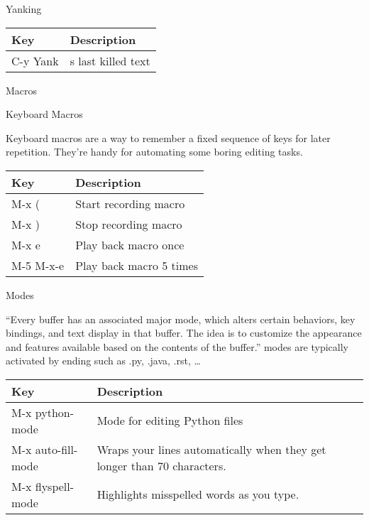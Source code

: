 Yanking

\begin{longtable}[]{@{}ll@{}}
\toprule
Key & Description\tabularnewline
\midrule
\endhead
C-y Yank & s last killed text\tabularnewline
\bottomrule
\end{longtable}

Macros

Keyboard Macros

Keyboard macros are a way to remember a fixed sequence of keys for later
repetition. They're handy for automating some boring editing tasks.

\begin{longtable}[]{@{}ll@{}}
\toprule
Key & Description\tabularnewline
\midrule
\endhead
M-x ( & Start recording macro\tabularnewline
M-x ) & Stop recording macro\tabularnewline
M-x e & Play back macro once\tabularnewline
M-5 M-x-e & Play back macro 5 times\tabularnewline
\bottomrule
\end{longtable}

Modes

``Every buffer has an associated major mode, which alters certain
behaviors, key bindings, and text display in that buffer. The idea is to
customize the appearance and features available based on the contents of
the buffer.'' modes are typically activated by ending such as .py,
.java, .rst, \ldots{}

\begin{longtable}[]{@{}ll@{}}
\toprule
Key & Description\tabularnewline
\midrule
\endhead
M-x python-mode & Mode for editing Python files\tabularnewline
M-x auto-fill-mode & Wraps your lines automatically when they get longer
than 70 characters.\tabularnewline
M-x flyspell-mode & Highlights misspelled words as you
type.\tabularnewline
\bottomrule
\end{longtable}
